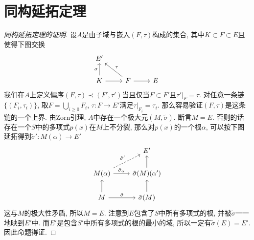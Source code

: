 \section{同构延拓定理}\label{proof of iso ext thm}

\begin{proof}[同构延拓定理的证明]
    设$A$是由子域与嵌入$(F,\tau)$构成的集合, 其中$K\subset F\subset E$且使得下图交换
    \[\begin{tikzcd}
        E' & & \\
        K\ar[u, "\sigma"] \ar[r] & F \ar[ul, "\tau"'] \ar[r] & E
    \end{tikzcd}\]
    我们在$A$上定义偏序$(F,\tau)\prec(F',\tau')$当且仅当$F\subset F'$且$\tau'|_F=\tau$.
    对任意一条链$\{(F_i,\tau_i)\}$, 取$F=\bigcup_{i\geq 0}F_i$, $\tau:F\to E'$满足$\tau|_{F_i}=\tau_i$.
    那么容易验证$(F,\tau)$是这条链的一个上界.
    由Zorn引理, $A$中存在一个极大元$(M,\tilde{\sigma})$.
    断言$M=E$. 否则的话存在一个$S$中的多项式$p(x)$在$M$上不分裂, 那么对$p(x)$的一个根$\alpha$, 可以按下图延拓得到$\tilde{\sigma}':M(\alpha)\to E'$
    \[\begin{tikzcd}
         & E'\\
        M(\alpha)\ar[r, "\tilde{\sigma}_\alpha"] \ar[ur, dashed, "\tilde{\sigma}'"] & \tilde{\sigma}(M)(\alpha') \ar[u]\\
        M \ar[r, "\tilde{\sigma}"] \ar[u] & \tilde{\sigma}(M) \ar[u]
    \end{tikzcd}\]
    这与$M$的极大性矛盾, 所以$M=E$.
    注意到$E$包含了$S$中所有多项式的根, 并被$\tilde{\sigma}$一一地映到$E'$中.
    而$E'$是包含$S'$中所有多项式的根的最小的域, 所以一定有$\tilde{\sigma}(E)=E'$.
    因此命题得证.
\end{proof}